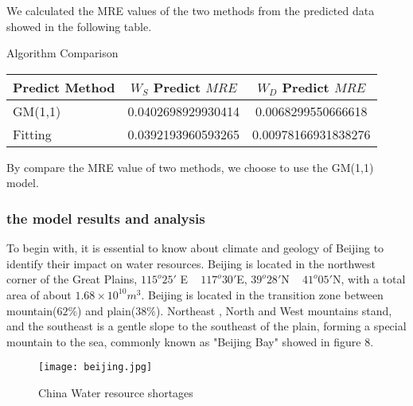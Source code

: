 \documentclass{mcmthesis}
\begin{document}
\par We calculated the MRE values of the two methods from the predicted data showed in the following table.
\begin{center}
	Algorithm Comparison
\begin{tabular}{l|cc}
\toprule 
Predict Method & $W_S$ Predict $MRE$ &  $W_D$ Predict $MRE$\\
\midrule
GM(1,1) & 0.0402698929930414 & 0.0068299550666618\\
Fitting & 0.0392193960593265 & 0.00978166931838276\\
\bottomrule
\end{tabular}
\end{center}

\par By compare the MRE value of two methods, we choose to use the GM(1,1) model.




\subsubsection{the model results and analysis}
\par To begin with, it is essential to know about climate and geology of Beijing to identify their impact on water resources. Beijing is located in the northwest corner of the Great Plains, $115^o25'$ E ~ $117^o30'$E, $39^o28'$N ~ $41^o05'$N, with a total area of about $1.68\times10^{10}m^3$. Beijing is located in the transition zone between mountain($62\%$) and plain($38\%$). Northeast , North and West mountains stand, and the southeast is a gentle slope to the southeast of the plain, forming a special mountain to the sea, commonly known as "Beijing Bay" showed in figure 8.

\begin{figure}[h]
\small
\centering
\texttt{[image: beijing.jpg]}
\caption{China Water resource shortages} \label{fig:China Water resource shortages}
\end{figure}
\end{document}

